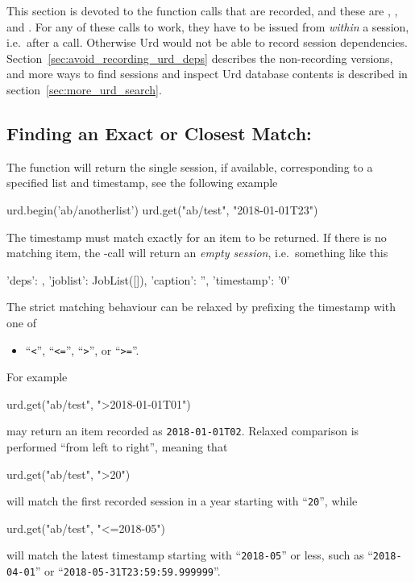 This section is devoted to the function calls that are recorded, and
these are , , and .
For any of these calls to work, they have to be issued
from \textsl{within} a session, i.e.\ after a  call.
Otherwise Urd would not be able to record session dependencies.
Section~\ref{sec:avoid_recording_urd_deps} describes the non-recording
versions, and more ways to find sessions and inspect Urd database
contents is described in section~\ref{sec:more_urd_search}.



\subsection{Finding an Exact or Closest Match:  }
\label{sec:urd_get}

The  function will return the single session, if
available, corresponding to a specified list and timestamp, see the
following example
\begin{python}
urd.begin('ab/anotherlist')
urd.get("ab/test", "2018-01-01T23")
\end{python}
The timestamp must match exactly for an item to be returned.  If there
is no matching item, the -call will return
an \textsl{empty session}, i.e.\ something like this
\begin{python}
{'deps': {}, 'joblist': JobList([]), 'caption': '', 'timestamp': '0'}
\end{python}
The strict matching behaviour can be relaxed by prefixing the
timestamp with one of
\begin{itemize}
\item[] ``\texttt{<}'', ``\texttt{<=}'', ``\texttt{>}'', or ``\texttt{>=}''.
\end{itemize}
For example
\begin{python}
urd.get("ab/test", ">2018-01-01T01")
\end{python}
may return an item recorded as \texttt{2018-01-01T02}.  Relaxed
comparison is performed ``from left to right'', meaning that
\begin{python}
urd.get("ab/test", ">20")
\end{python}
will match the first recorded session in a year starting with
``\texttt{20}'', while
\begin{python}
urd.get("ab/test", "<=2018-05")
\end{python}
will match the latest timestamp starting with ``\texttt{2018-05}'' or less,
such as ``\texttt{2018-04-01}'' or ``\texttt{2018-05-31T23:59:59.999999}''.



